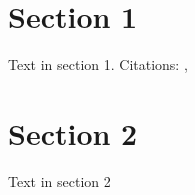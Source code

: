 \documentclass{article}
\begin{document}
\section{Section 1}
\label{sec:section1}
Text in section 1. Citations: \cite{cite1}, \cite{cite2}

\section{Section 2}
\label{sec:section2}
Text in section 2



\printbibliography
\end{document}
